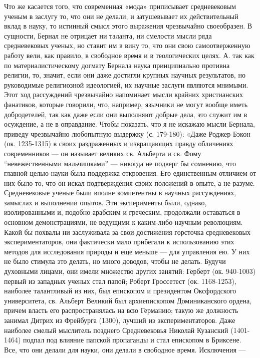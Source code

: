 Что же касается того, что современная «мода» приписывает средневековым
ученым в заслугу то, что они не делали, и затушевывает их
действительный вклад в науку, то истинный смысл этого выражения
чрезвычайно своеобразен. В сущности, Бернал не отрицает ни таланта, ни
смелости мысли ряда средневековых ученых, но ставит им в вину то, что
они свою самоотверженную работу вели, как правило, в свободное время и
в теологических целях. А. так как по материалистическому догмату
Бернала наука принципиально противна религии, то, значит, если они
даже достигли крупных научных результатов, но руководимые религиозной
идеологией, их научные заслуги являются мнимыми. Этот ход рассуждений
чрезвычайно напоминает мысли крайних христианских фанатиков, которые
говорили, что, например, язычники не могут вообще иметь добродетелей,
так как даже если они выполняют добрые дела, это служит им в
осуждение, а не в оправдание. Чтобы показать, что я не искажаю мысли
Бернала, приведу чрезвычайно любопытную выдержку (с. 179-180): «Даже
Роджер Бэкон (ок. 1235-1315) в своих раздраженных и извращающих правду
обличениях современников --- он называет великих св. Альберта и св.
Фому ``невежественными мальчишками'' --- никогда не подверг бы
сомнению, что главной целью науки была поддержка откровения. Его
единственным отличием от них было то, что он искал подтверждения своих
положений в опыте, а не разуме. Средневековые ученые были вполне
компетентны в научных рассуждениях, замыслах и выполнении опытов. Эти
эксперименты были, однако, изолированными и, подобно арабским и
греческим, продолжали оставаться в основном демонстрациями, не
ведущими к каким-либо научным революциям. Какой бы похвалы ни
заслуживала за свои достижения горсточка средневековых
экспериментаторов, они фактически мало прибегали к использованию этих
методов для исследования природы и еще меньше --- для управления ею. У
них не было стимула это делать, но много доводов, чтобы не делать.
Будучи духовными лицами, они имели множество других занятий: Герберт
(ок. 940-1003) первый из западных ученых стал папой; Роберт Гроссетест
(ок. 1168-1253), наиболее талантливый из них, был епископом и
президентом Оксфордского университета, св. Альберт Великий был
архиепископом Доминиканского ордена, причем власть его
распространялась на всю Германию; такую же должность занимал Дитрих из
Фрейбурга (1300), лучший из экспериментаторов. Даже наиболее смелый
мыслитель позднего Средневековья Николай Кузанский (1401-1464) подпал
под влияние папской пропаганды и стал епископом в Бриксене. Все, что
они делали для науки, они делали в свободное время. Исключения ---
